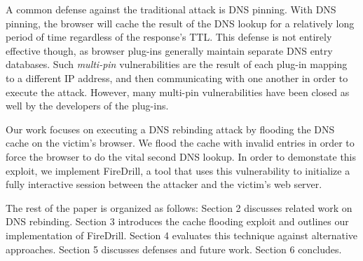 A common defense against the traditional attack is DNS pinning. With DNS pinning, the browser will cache the result of the DNS lookup for a relatively long period of time regardless of the response's TTL. This defense is not entirely effective though, as browser plug-ins generally maintain separate DNS entry databases. Such \emph{multi-pin} vulnerabilities are the result of each plug-in mapping to a different IP address, and then communicating with one another in order to execute the attack. However, many multi-pin vulnerabilities have been closed as well by the developers of the plug-ins. 

Our work focuses on executing a DNS rebinding attack by flooding the DNS cache on the victim's browser. We flood the cache with invalid entries in order to force the browser to do the vital second DNS lookup. In order to demonstate this exploit, we implement FireDrill, a tool that uses this vulnerability to initialize a fully interactive session between the attacker and the victim's web server.

The rest of the paper is organized as follows: Section 2 discusses related work on DNS rebinding. Section 3 introduces the cache flooding exploit and outlines our implementation of FireDrill. Section 4 evaluates this technique against alternative approaches. Section 5 discusses defenses and future work. Section 6 concludes.
